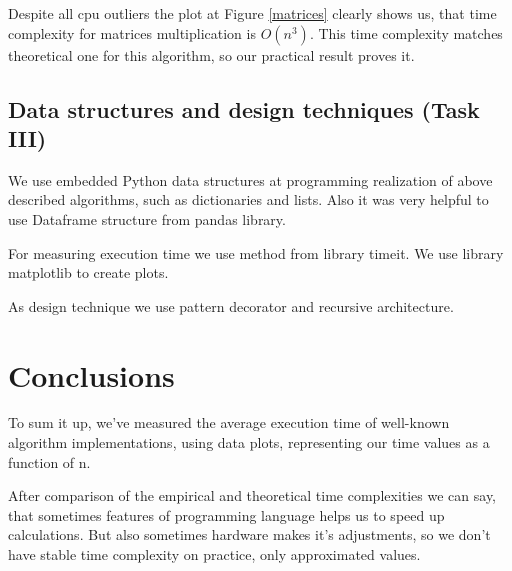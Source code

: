 \documentclass[a4paper,article,14pt]{extarticle}
\begin{document}
	Despite all cpu outliers the plot at Figure \ref{matrices} clearly shows us, that time complexity for matrices multiplication is $O(n^3)$. This time complexity matches theoretical one for this algorithm, so our practical result proves it.
	
	\subsection{Data structures and design techniques (Task III)}
	
	We use embedded Python data structures at programming realization of above described algorithms, such as dictionaries and lists. Also it was very helpful to use Dataframe structure from \flqq pandas\frqq $ $ library.
	
	For measuring execution time we use method from library \flqq timeit\frqq. We use library \flqq matplotlib\frqq $ $ to create plots.
	
	As design technique we use pattern decorator and recursive architecture.
	
	
	\section{Conclusions}
	To sum it up, we've measured the average execution time of well-known algorithm implementations, using data plots, representing our time values as a function of n. 
	
	After comparison of the empirical and theoretical time complexities we can say, that sometimes features of programming language helps us to speed up calculations. But also sometimes hardware makes it's adjustments, so we don't have stable time complexity on practice, only approximated values. 
	
	\newpage
\end{document}
